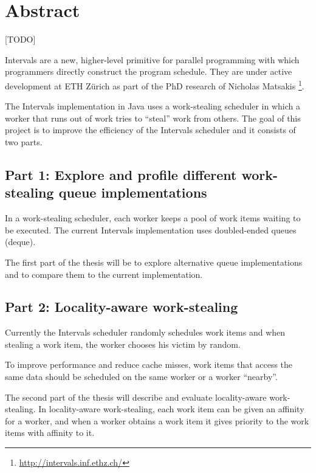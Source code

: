 
\chapter*{Abstract}
\label{chap:abstract}

[TODO]

Intervals are a new, higher-level primitive for parallel programming
with which programmers directly construct the program schedule. They
are under active development at ETH Zürich as part of the PhD research
of Nicholas Matsakis \footnote{\url{http://intervals.inf.ethz.ch/}}.

The Intervals implementation in Java uses a work-stealing scheduler in
which a worker that runs out of work tries to ``steal'' work from
others. The goal of this project is to improve the efficiency of the
Intervals scheduler and it consists of two parts.

\section*{Part 1: Explore and profile different work-stealing queue
  implementations}
\label{sec:abstract-part1}

In a work-stealing scheduler, each worker keeps a pool of work items
waiting to be executed. The current Intervals implementation uses
doubled-ended queues (deque).

The first part of the thesis will be to explore alternative queue
implementations and to compare them to the current implementation.

\section*{Part 2: Locality-aware work-stealing}
\label{sec:abstract-part2}

Currently the Intervals scheduler randomly schedules work items and
when stealing a work item, the worker chooses his victim by random.

To improve performance and reduce cache misses, work items that access
the same data should be scheduled on the same worker or a worker
``nearby''.

The second part of the thesis will describe and evaluate
locality-aware work-stealing. In locality-aware work-stealing, each
work item can be given an affinity for a worker, and when a worker
obtains a work item it gives priority to the work items with affinity
to it.


